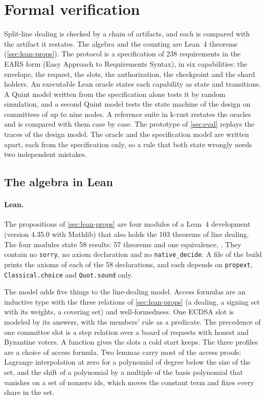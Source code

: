 \section{Formal verification}\label{sec:formal}

Split-line dealing is checked by a chain of artifacts, and each is compared with the artifact it restates. The algebra and the counting are Lean~4 theorems (\cref{sec:lean-props}). The protocol is a specification of 238 requirements in the EARS form (Easy Approach to Requirements Syntax), in six capabilities: the envelope, the request, the slots, the authorization, the checkpoint and the shard holders. An executable Lean oracle states each capability as state and transitions. A Quint model written from the specification alone tests it by random simulation, and a second Quint model tests the state machine of the design on committees of up to nine nodes. A reference suite in k-rust restates the oracles and is compared with them case by case. The prototype of \cref{sec:eval} replays the traces of the design model. The oracle and the specification model are written apart, each from the specification only, so a rule that both state wrongly needs two independent mistakes.

\subsection{The algebra in Lean}

\paragraph{Lean.} The propositions of \cref{sec:lean-props} are four modules of a Lean~4 development (version 4.35.0 with Mathlib) that also holds the 103 theorems of line dealing. The four modules state 58 results: 57 theorems and one equivalence, . They contain no \texttt{sorry}, no axiom declaration and no \texttt{native\_decide}. A file of the build prints the axioms of each of the 58 declarations, and each depends on \texttt{propext}, \texttt{Classical.choice} and \texttt{Quot.sound} only.

The model adds five things to the line-dealing model. Access formulas are an inductive type with the three relations of \cref{sec:lean-props} (a dealing, a signing set with its weights, a covering set) and well-formedness. One ECDSA slot is modeled by its answers, with the members' rule as a predicate. The precedence of one committee slot is a step relation over a board of requests with honest and Byzantine voters. A function gives the slots a cold start keeps. The three profiles are a choice of access formula. Two lemmas carry most of the access proofs: Lagrange interpolation at zero for a polynomial of degree below the size of the set, and the shift of a polynomial by a multiple of the basis polynomial that vanishes on a set of nonzero ids, which moves the constant term and fixes every share in the set.


